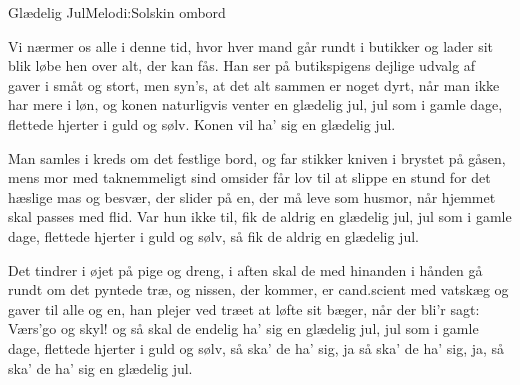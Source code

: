 \begin{sang}{Glædelig Jul}{Melodi:Solskin ombord}
\begin{vers}
Vi nærmer os alle i denne tid, hvor hver mand
går rundt i butikker og lader sit
blik løbe hen over alt, der kan fås.
Han ser på butikspigens dejlige 
udvalg af gaver i småt og stort,
men syn's, at det alt sammen er noget
dyrt, når man ikke har mere i løn,
og konen naturligvis venter en
glædelig jul, jul som i gamle dage,
flettede hjerter i guld og sølv.
Konen vil ha' sig en glædelig jul.
\end{vers}
\begin{vers}
Man samles i kreds om det festlige bord,
og far stikker kniven i brystet på
gåsen, mens mor med taknemmeligt sind
omsider får lov til at slippe en
stund for det hæslige mas og besvær,
der slider på en, der må leve som
husmor, når hjemmet skal passes med flid.
Var hun ikke til, fik de aldrig en
glædelig jul, jul som i gamle dage,
flettede hjerter i guld og sølv,
så fik de aldrig en glædelig jul.
\end{vers}
\begin{vers}
Det tindrer i øjet på pige og dreng,
i aften skal de med hinanden i
hånden gå rundt om det pyntede træ,
og nissen, der kommer, er cand.scient med
vatskæg og gaver til alle og en,
han plejer ved træet at løfte sit
bæger, når der bli'r sagt: Værs'go og skyl!
og så skal de endelig ha' sig en
glædelig jul, jul som i gamle dage,
flettede hjerter i guld og sølv,
så ska' de ha' sig, ja så ska' de ha' sig,
ja, så ska' de ha' sig en glædelig jul.
\end{vers}
\laps
\end{sang}